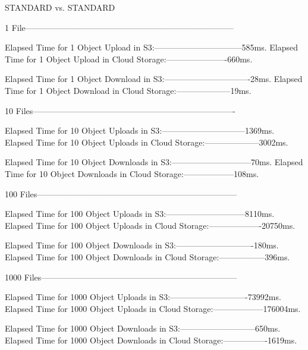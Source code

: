 \begin{code}
STANDARD vs. STANDARD

1 File---------------------------------------------------------------------------

Elapsed Time for 1  Object Upload in S3:--------------------------------585ms.
Elapsed Time for 1 Object Upload in Cloud Storage:----------------------660ms.

Elapsed Time for 1 Object Download in S3:-------------------------------28ms.
Elapsed Time for 1 Object Download in Cloud Storage:--------------------19ms.

10 Files-------------------------------------------------------------------------

Elapsed Time for 10  Object Uploads in S3:------------------------------1369ms.
Elapsed Time for 10 Object Uploads in Cloud Storage:--------------------3002ms.

Elapsed Time for 10 Object Downloads in S3:-----------------------------70ms.
Elapsed Time for 10 Object Downloads in Cloud Storage:------------------108ms.

100 Files------------------------------------------------------------------------

Elapsed Time for 100  Object Uploads in S3:-----------------------------8110ms.
Elapsed Time for 100 Object Uploads in Cloud Storage:-------------------20750ms.

Elapsed Time for 100 Object Downloads in S3:----------------------------180ms.
Elapsed Time for 100 Object Downloads in Cloud Storage:-----------------396ms.

1000 Files-----------------------------------------------------------------------

Elapsed Time for 1000  Object Uploads in S3:----------------------------73992ms.
Elapsed Time for 1000 Object Uploads in Cloud Storage:------------------176004ms.

Elapsed Time for 1000 Object Downloads in S3:---------------------------650ms.
Elapsed Time for 1000 Object Downloads in Cloud Storage:----------------1619ms.

\end{code}

\newpage


